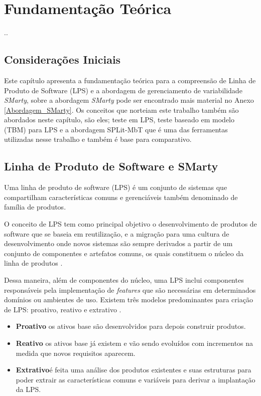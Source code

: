 \chapter{Fundamentação Teórica}
\label{sec:fundamentacao}
\pagestyle{plain}

..

\section{Considerações Iniciais}


Este capítulo apresenta a fundamentação teórica para a compreensão de Linha de Produto de Software (LPS) e a abordagem de gerenciamento de variabilidade \textit{SMarty}, sobre a abordagem \textit{SMarty} pode ser encontrado mais material no Anexo \ref{Abordagem_SMarty}. Os conceitos que norteiam este trabalho também são abordados neste capítulo, são eles; teste em LPS, teste baseado em modelo (TBM) para LPS e a abordagem SPLit-MbT que é uma das ferramentas utilizadas nesse trabalho e também é base para comparativo.

\section{Linha de Produto de Software e SMarty}

Uma linha de produto de software (LPS) é um conjunto de sistemas que compartilham características comuns e gerenciáveis \cite{clements2002software} também denominado de família de produtos.

O conceito de LPS tem como principal objetivo o desenvolvimento de produtos de software que se baseia em reutilização, e a migração para uma cultura de desenvolvimento onde novos sistemas são sempre derivados a partir de um conjunto de componentes e artefatos comuns, os quais constituem o núcleo da linha de produtos \cite{linden2007product}. 

Dessa maneira, além de componentes do núcleo, uma LPS inclui componentes responsáveis pela implementação de \textit{features} que são necessárias em determinados domínios ou ambientes de uso. Existem três modelos predominantes para criação de LPS: proativo, reativo e extrativo \cite{pohl2005software}.

\begin{itemize}
	\item \textbf{Proativo} os ativos base são desenvolvidos para depois construir produtos.
	\item \textbf{Reativo} os ativos base já existem e vão sendo evoluídos com incrementos na medida que novos requisitos aparecem.
	\item \textbf{Extrativo}é feita uma análise dos produtos existentes e suas estruturas para poder extrair as características comuns e variáveis para derivar a implantação da LPS.
\end{itemize}

